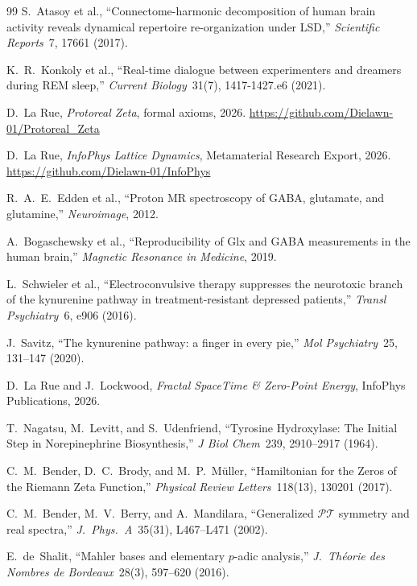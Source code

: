 \begin{thebibliography}{99}
 S.~Atasoy et al., ``Connectome-harmonic decomposition of human brain activity reveals dynamical repertoire re-organization under LSD,'' \emph{Scientific Reports}\ 7, 17661 (2017).

 K.~R.~Konkoly et al., ``Real-time dialogue between experimenters and dreamers during REM sleep,'' \emph{Current Biology}\ 31(7), 1417-1427.e6 (2021).

 D.~La Rue, \emph{Protoreal Zeta}, formal axioms, 2026. \url{https://github.com/Dielawn-01/Protoreal_Zeta}

 D.~La Rue, \emph{InfoPhys Lattice Dynamics}, Metamaterial Research Export, 2026. \url{https://github.com/Dielawn-01/InfoPhys}

 R.~A.~E.~Edden et al., ``Proton MR spectroscopy of GABA, glutamate, and glutamine,'' \emph{Neuroimage}, 2012.

 A.~Bogaschewsky et al., ``Reproducibility of Glx and GABA measurements in the human brain,'' \emph{Magnetic Resonance in Medicine}, 2019.

 L.~Schwieler et al., ``Electroconvulsive therapy suppresses the neurotoxic branch of the kynurenine pathway in treatment-resistant depressed patients,'' \emph{Transl Psychiatry}\ 6, e906 (2016).

 J.~Savitz, ``The kynurenine pathway: a finger in every pie,'' \emph{Mol Psychiatry}\ 25, 131--147 (2020).

 D.~La Rue and J.~Lockwood, \emph{Fractal SpaceTime \& Zero-Point Energy}, InfoPhys Publications, 2026.

 T.~Nagatsu, M.~Levitt, and S.~Udenfriend, ``Tyrosine Hydroxylase: The Initial Step in Norepinephrine Biosynthesis,'' \emph{J Biol Chem}\ 239, 2910--2917 (1964).

 C.~M.~Bender, D.~C.~Brody, and M.~P.~M\"uller, ``Hamiltonian for the Zeros of the Riemann Zeta Function,'' \emph{Physical Review Letters}\ 118(13), 130201 (2017).

 C.~M.~Bender, M.~V.~Berry, and A.~Mandilara, ``Generalized $\mathcal{PT}$ symmetry and real spectra,'' \emph{J.\ Phys.\ A}\ 35(31), L467--L471 (2002).

 E.~de~Shalit, ``Mahler bases and elementary $p$-adic analysis,'' \emph{J.\ Th\'eorie des Nombres de Bordeaux}\ 28(3), 597--620 (2016).


\end{thebibliography}
